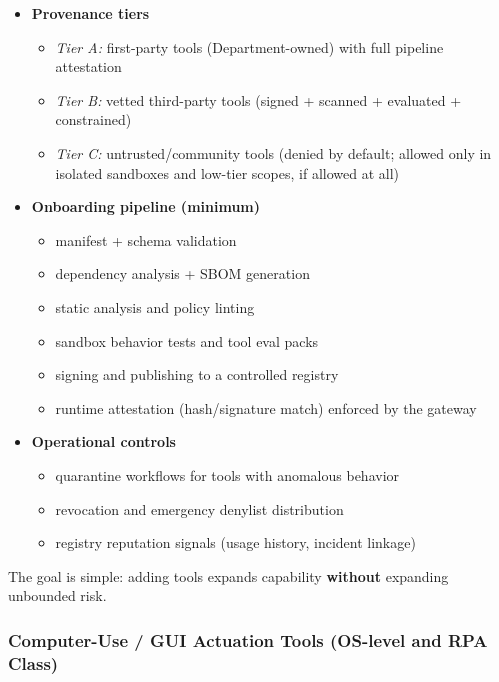 \documentclass[11pt]{article}
\begin{document}
\begin{itemize}
\tightlist
\item
  \textbf{Provenance tiers}

  \begin{itemize}
  \tightlist
  \item
    \emph{Tier A:} first-party tools (Department-owned) with full
    pipeline attestation
  \item
    \emph{Tier B:} vetted third-party tools (signed + scanned +
    evaluated + constrained)
  \item
    \emph{Tier C:} untrusted/community tools (denied by default; allowed
    only in isolated sandboxes and low-tier scopes, if allowed at all)
  \end{itemize}
\item
  \textbf{Onboarding pipeline (minimum)}

  \begin{itemize}
  \tightlist
  \item
    manifest + schema validation
  \item
    dependency analysis + SBOM generation
  \item
    static analysis and policy linting
  \item
    sandbox behavior tests and tool eval packs
  \item
    signing and publishing to a controlled registry
  \item
    runtime attestation (hash/signature match) enforced by the gateway
  \end{itemize}
\item
  \textbf{Operational controls}

  \begin{itemize}
  \tightlist
  \item
    quarantine workflows for tools with anomalous behavior
  \item
    revocation and emergency denylist distribution
  \item
    registry reputation signals (usage history, incident linkage)
  \end{itemize}
\end{itemize}

The goal is simple: adding tools expands capability \textbf{without}
expanding unbounded risk.

\hypertarget{computer-use-gui-actuation-tools-os-level-and-rpa-class}{%
\subsubsection{Computer-Use / GUI Actuation Tools (OS-level and RPA Class)}\label{computer-use-gui-actuation-tools-os-level-and-rpa-class}}
\end{document}
